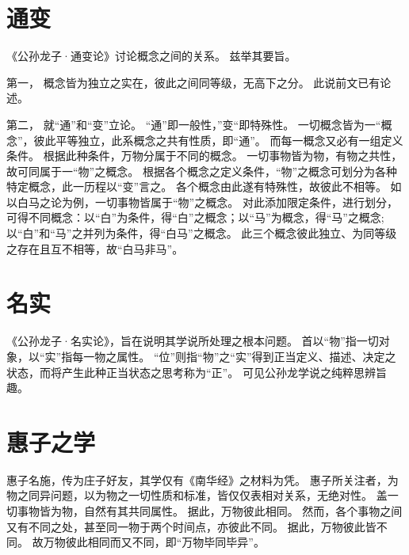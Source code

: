 \documentclass[11pt]{article}
\begin{document}
\section{通变}
《公孙龙子·通变论》讨论概念之间的关系。
兹举其要旨。

\par

第一， 概念皆为独立之实在，彼此之间同等级，无高下之分。
此说前文已有论述。

\par

第二， 就“通”和“变”立论。
“通”即一般性，”变“即特殊性。
一切概念皆为一“概念”，彼此平等独立，此系概念之共有性质，即“通”。
而每一概念又必有一组定义条件。
根据此种条件，万物分属于不同的概念。
一切事物皆为物，有物之共性，故可同属于一“物”之概念。
根据各个概念之定义条件，“物”之概念可划分为各种特定概念，此一历程以“变”言之。
各个概念由此遂有特殊性，故彼此不相等。
如以白马之论为例，一切事物皆属于“物”之概念。
对此添加限定条件，进行划分，可得不同概念：以“白”为条件，得“白”之概念；以“马”为概念，得“马”之概念;以“白”和“马”之并列为条件，得“白马”之概念。
此三个概念彼此独立、为同等级之存在且互不相等，故“白马非马”。

\section{名实}
《公孙龙子·名实论》，旨在说明其学说所处理之根本问题。
首以“物”指一切对象，以“实”指每一物之属性。
“位”则指“物”之“实”得到正当定义、描述、决定之状态，而将产生此种正当状态之思考称为“正”。
可见公孙龙学说之纯粹思辨旨趣。

\section{惠子之学}
惠子名施，传为庄子好友，其学仅有《南华经》之材料为凭。
惠子所关注者，为物之同异问题，以为物之一切性质和标准，皆仅仅表相对关系，无绝对性。
盖一切事物皆为物，自然有其共同属性。
据此，万物彼此相同。
然而，各个事物之间又有不同之处，甚至同一物于两个时间点，亦彼此不同。
据此，万物彼此皆不同。
故万物彼此相同而又不同，即“万物毕同毕异”。
  
\end{document}
